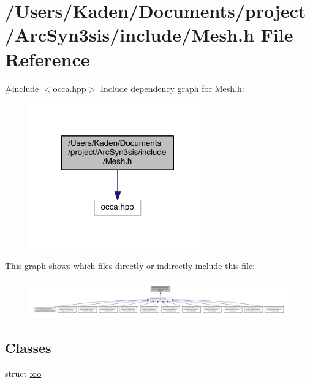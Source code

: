 \hypertarget{a00557}{}\section{/\+Users/\+Kaden/\+Documents/project/\+Arc\+Syn3sis/include/\+Mesh.h File Reference}
\label{a00557}
{\ttfamily \#include $<$occa.\+hpp$>$}\newline
Include dependency graph for Mesh.\+h\+:\nopagebreak
\begin{figure}[H]
\begin{center}
\leavevmode
\includegraphics[width=216pt]{a00558}
\end{center}
\end{figure}
This graph shows which files directly or indirectly include this file\+:\nopagebreak
\begin{figure}[H]
\begin{center}
\leavevmode
\includegraphics[width=350pt]{a00559}
\end{center}
\end{figure}
\subsection*{Classes}
\begin{DoxyCompactItemize}
\item 
struct \hyperlink{a00758}{foo}
\end{DoxyCompactItemize}
